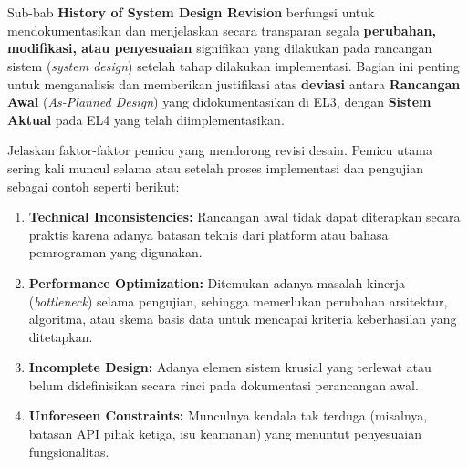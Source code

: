 \documentclass{elsinta}
\begin{document}
\section{\HistoryDesignRevisionTitle}
\label{sec:design_revision}

Sub-bab \textbf{History of System Design Revision} berfungsi untuk mendokumentasikan dan menjelaskan secara transparan segala \textbf{perubahan, modifikasi, atau penyesuaian} signifikan yang dilakukan pada rancangan sistem (\textit{system design}) setelah tahap dilakukan implementasi. Bagian ini penting untuk menganalisis dan memberikan justifikasi atas \textbf{deviasi} antara \textbf{Rancangan Awal} (\textit{As-Planned Design}) yang didokumentasikan di EL3, dengan \textbf{Sistem Aktual} pada EL4 yang telah diimplementasikan.

Jelaskan faktor-faktor pemicu yang mendorong revisi desain. Pemicu utama sering kali muncul selama atau setelah proses implementasi dan pengujian sebagai contoh seperti berikut:

\begin{enumerate}
    \item \textbf{Technical Inconsistencies:} Rancangan awal tidak dapat diterapkan secara praktis karena adanya batasan teknis dari platform atau bahasa pemrograman yang digunakan.
    \item \textbf{Performance Optimization:} Ditemukan adanya masalah kinerja (\textit{bottleneck}) selama pengujian, sehingga memerlukan perubahan arsitektur, algoritma, atau skema basis data untuk mencapai kriteria keberhasilan yang ditetapkan.
    \item \textbf{Incomplete Design:} Adanya elemen sistem krusial yang terlewat atau belum didefinisikan secara rinci pada dokumentasi perancangan awal.
    \item \textbf{Unforeseen Constraints:} Munculnya kendala tak terduga (misalnya, batasan API pihak ketiga, isu keamanan) yang menuntut penyesuaian fungsionalitas.
\end{enumerate}
\end{document}
